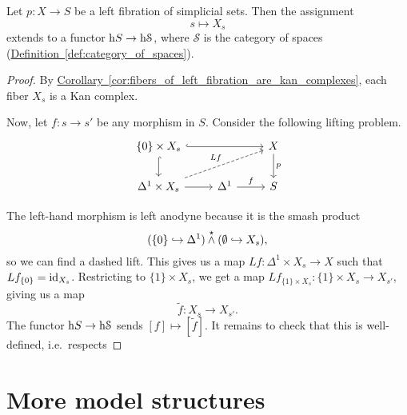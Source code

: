 \documentclass[main.tex]{subfiles}
\begin{document}
\begin{theorem}
  Let $p\colon X \to S$ be a left fibration of simplicial sets. Then the assignment
  \begin{equation*}
    s \mapsto X_{s}
  \end{equation*}
  extends to a functor $\mathrm{h} S \to \mathrm{h}\mathcal{S}$, where $\mathcal{S}$ is the category of spaces (\hyperref[def:category_of_spaces]{Definition~\ref*{def:category_of_spaces}}).
\end{theorem}
\begin{proof}
  By \hyperref[cor:fibers_of_left_fibration_are_kan_complexes]{Corollary~\ref*{cor:fibers_of_left_fibration_are_kan_complexes}}, each fiber $X_{s}$ is a Kan complex.

  Now, let $f\colon s \to s'$ be any morphism in $S$. Consider the following lifting problem.
  \begin{equation*}
    \begin{tikzcd}
      \{0\} \times X_{s}
      \arrow[d, swap, hookrightarrow]
      \arrow[rr, hookrightarrow]
      && X
      \arrow[d, "p"]
      \\
      \Delta^{1} \times X_{s}
      \arrow[r]
      \arrow[urr, dashed, "Lf"]
      & \Delta^{1}
      \arrow[r, "f"]
      & S
    \end{tikzcd}
  \end{equation*}

  The left-hand morphism is left anodyne because it is the smash product
  \begin{equation*}
    (\{0\} \hookrightarrow \Delta^{1}) \overset{\star}{\wedge} (\emptyset \hookrightarrow X_{s}),
  \end{equation*}
  so we can find a dashed lift. This gives us a map $Lf\colon \Delta^{1} \times X_{s} \to X$ such that $Lf_{\{0\}} = \mathrm{id}_{X_{s}}$. Restricting to $\{1\} \times X_{s}$, we get a map $Lf_{\{1\} \times X_{s}}\colon \{1\} \times X_{s} \to X_{s'}$, giving us a map
  \begin{equation*}
    \tilde{f}\colon X_{s} \to X_{s'}.
  \end{equation*}
  The functor $\mathrm{h} S \to \mathrm{h}\mathcal{S}$ sends $[f] \mapsto [\tilde{f}]$. It remains to check that this is well-defined, i.e.\ respects
\end{proof}

\section{More model structures}
\label{sec:more_model_structures}
\end{document}
